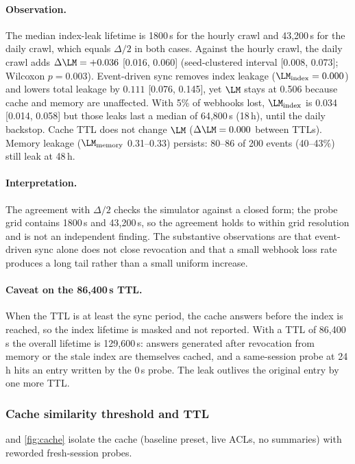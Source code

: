 \paragraph{Observation.}
The median index-leak lifetime is 1800\,s for the hourly crawl and 43{,}200\,s for the daily crawl, which equals $\Delta/2$ in both cases. Against the hourly crawl, the daily crawl adds $\Delta\LM=+0.036$ [0.016, 0.060] (seed-clustered interval [0.008, 0.073]; Wilcoxon $p=0.003$). Event-driven sync removes index leakage ($\LM_{\text{index}}=0.000$) and lowers total leakage by $0.111$ [0.076, 0.145], yet $\LM$ stays at 0.506 because cache and memory are unaffected. With 5\% of webhooks lost, $\LM_{\text{index}}$ is 0.034 [0.014, 0.058] but those leaks last a median of 64{,}800\,s (18\,h), until the daily backstop. Cache TTL does not change $\LM$ ($\Delta\LM=0.000$ between TTLs). Memory leakage ($\LM_{\text{memory}}$ 0.31--0.33) persists: 80--86 of 200 events (40--43\%) still leak at 48\,h.

\paragraph{Interpretation.}
The agreement with $\Delta/2$ checks the simulator against a closed form; the probe grid contains 1800\,s and 43{,}200\,s, so the agreement holds to within grid resolution and is not an independent finding. The substantive observations are that event-driven sync alone does not close revocation and that a small webhook loss rate produces a long tail rather than a small uniform increase.

\paragraph{Caveat on the 86{,}400\,s TTL.}
When the TTL is at least the sync period, the cache answers before the index is reached, so the index lifetime is masked and not reported. With a TTL of 86{,}400\,s the overall lifetime is 129{,}600\,s: answers generated after revocation from memory or the stale index are themselves cached, and a same-session probe at 24\,h hits an entry written by the 0\,s probe. The leak outlives the original entry by one more TTL.

\subsubsection{Cache similarity threshold and TTL}
 and \cref{fig:cache} isolate the cache (baseline preset, live ACLs, no summaries) with reworded fresh-session probes.

